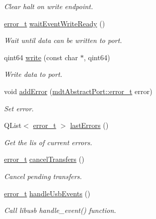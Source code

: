 \begin{DoxyCompactItemize}
\begin{DoxyCompactList}\small\item\em Clear halt on write endpoint. \end{DoxyCompactList}\item 
\hyperlink{classmdt_abstract_port_ad4121bb930c95887e77f8bafa065a85e}{error\_\-t} \hyperlink{classmdt_usb_port_a3be875f6f10ae94fd3a94f925bb935e7}{waitEventWriteReady} ()
\begin{DoxyCompactList}\small\item\em Wait until data can be written to port. \end{DoxyCompactList}\item 
qint64 \hyperlink{classmdt_usb_port_ae777e33325ff2adef326dd7f81b00838}{write} (const char $\ast$, qint64)
\begin{DoxyCompactList}\small\item\em Write data to port. \end{DoxyCompactList}\item 
void \hyperlink{classmdt_usb_port_aa857e94b4167c53b26573042ee3af280}{addError} (\hyperlink{classmdt_abstract_port_ad4121bb930c95887e77f8bafa065a85e}{mdtAbstractPort::error\_\-t} error)
\begin{DoxyCompactList}\small\item\em Set error. \end{DoxyCompactList}\item 
QList$<$ \hyperlink{classmdt_abstract_port_ad4121bb930c95887e77f8bafa065a85e}{error\_\-t} $>$ \hyperlink{classmdt_usb_port_a81855cebd9b672a74d836955236c19bf}{lastErrors} ()
\begin{DoxyCompactList}\small\item\em Get the lis of current errors. \end{DoxyCompactList}\item 
\hyperlink{classmdt_abstract_port_ad4121bb930c95887e77f8bafa065a85e}{error\_\-t} \hyperlink{classmdt_usb_port_afe5b473e1df8b828c17f83a45a3902fb}{cancelTransfers} ()
\begin{DoxyCompactList}\small\item\em Cancel pending transfers. \end{DoxyCompactList}\item 
\hyperlink{classmdt_abstract_port_ad4121bb930c95887e77f8bafa065a85e}{error\_\-t} \hyperlink{classmdt_usb_port_abb66e85fc1366112eeb0a6e86f6e7e32}{handleUsbEvents} ()
\begin{DoxyCompactList}\small\item\em Call libusb handle\_\-event() function. \end{DoxyCompactList}\item 

\end{DoxyCompactItemize}
